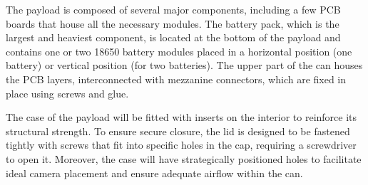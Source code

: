 The payload is composed of several major components, including a few PCB boards that house all the necessary modules. The battery pack, which is the largest and heaviest component, is located at the bottom of the payload and contains one or two 18650 battery modules placed in a horizontal position (one battery) or vertical position (for two batteries). The upper part of the can houses the PCB layers, interconnected with mezzanine connectors, which are fixed in place using screws and glue. %



The case of the payload will be fitted with inserts on the interior to reinforce its structural strength. To ensure secure closure, the lid is designed to be fastened tightly with screws that fit into specific holes in the cap, requiring a screwdriver to open it. Moreover, the case will have strategically positioned holes to facilitate ideal camera placement and ensure adequate airflow within the can. 
